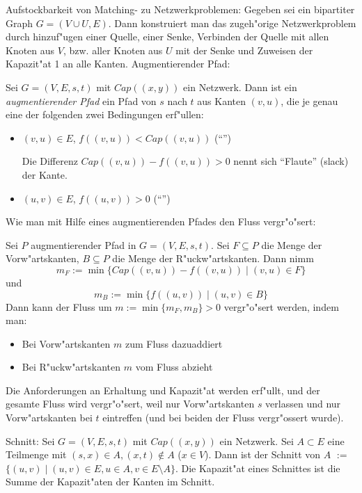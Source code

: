 \remark Aufstockbarkeit von Matching- zu Netzwerkproblemen:{
  Gegeben sei ein bipartiter Graph $G=(V\cup U,E)$. Dann konstruiert
  man das zugeh"orige Netzwerkproblem durch hinzuf"ugen einer Quelle,
  einer Senke, Verbinden der Quelle mit allen Knoten aus $V$, bzw.
  aller Knoten aus $U$ mit der Senke und Zuweisen der Kapazit"at 1 an 
  alle Kanten.
}
 Augmentierender Pfad:{
  Sei $G=(V,E,s,t)$ mit $Cap((x,y))$ ein Netzwerk. Dann ist ein 
  \textit{augmentierender Pfad} ein Pfad von $s$ nach $t$ aus 
  Kanten $(v,u)$, die je genau eine der folgenden zwei Bedingungen erf"ullen:
  \begin{itemize}
    \item $(v,u)\in E$, $f((v,u))<Cap((v,u))$ (``'')
    
      Die Differenz $Cap((v,u))-f((v,u))>0$ nennt sich ``Flaute'' (slack) der
      Kante.
    \item $(u,v)\in E$, $f((u,v))>0$ (``'')
  \end{itemize}
}
\remark Wie man mit Hilfe eines augmentierenden Pfades den Fluss vergr"o"sert:{
  Sei $P$ augmentierender Pfad in $G=(V,E,s,t)$.
  Sei $F\subseteq P$ die Menge der Vorw"artskanten, $B\subseteq P$
  die Menge der R"uckw"artskanten.
  Dann nimm 
  \[ m_F:=\min \{ Cap((v,u))-f((v,u)) \mid (v,u)\in F \} \]
  und
  \[ m_B:=\min \{ f((u,v)) \mid (u,v)\in B \} \]
  Dann kann der Fluss um $m:=\min\{m_F,m_B\}>0$ vergr"o"sert werden, indem man:
  \begin{itemize}
    \item Bei Vorw"artskanten $m$ zum Fluss dazuaddiert
    \item Bei R"uckw"artskanten $m$ vom Fluss abzieht
  \end{itemize}
  Die Anforderungen an Erhaltung und Kapazit"at werden erf"ullt, und der 
  gesamte Fluss wird vergr"o"sert, weil nur Vorw"artskanten $s$ verlassen
  und nur Vorw"artskanten bei $t$ eintreffen (und bei beiden der Fluss 
  vergr"ossert wurde).
}
 Schnitt:{
  Sei $G=(V,E,s,t)$ mit $Cap((x,y))$ ein Netzwerk. Sei $A\subset E$
  eine Teilmenge mit $(s,x)\in A,(x,t)\not\in A$ ($x\in V$).  
  Dann ist der Schnitt von $A$ $:=$ 
  $\{(u,v)\mid (u,v)\in E,u\in A, v\in E\setminus A\}$. Die Kapazit"at 
  eines Schnittes ist die Summe der Kapazit"aten der Kanten im Schnitt.
}
